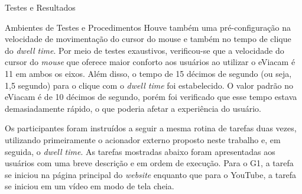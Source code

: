 \begin{chapter}{Testes e Resultados}
\begin{section}{Ambientes de Testes e Procedimentos}
Houve também uma pré-configuração na velocidade de movimentação do cursor do
mouse e também no tempo de clique do \textit{dwell time}. Por meio de testes
exaustivos, verificou-se que a velocidade do cursor do \textit{mouse} que
oferece maior conforto aos usuários ao utilizar o eViacam é 11 em ambos os eixos.
Além disso, o tempo de 15 décimos de segundo (ou seja, 1,5 segundo) para o
clique com o \textit{dwell time} foi estabelecido. O valor padrão no eViacam é
de 10 décimos de segundo, porém foi verificado que esse tempo estava
demasiadamente rápido, o que poderia afetar a experiência do usuário.

Os participantes foram instruídos a seguir a mesma rotina de tarefas duas vezes,
utilizando primeiramente o acionador externo proposto neste trabalho e, em
seguida, o \textit{dwell time}. As tarefas mostradas abaixo foram
apresentadas aos usuários com uma breve descrição e em ordem de execução.
Para o G1, a tarefa se iniciou na página principal do \textit{website} enquanto
que para o YouTube, a tarefa se iniciou em um vídeo em modo de tela cheia.  


\end{section}
\end{chapter}
